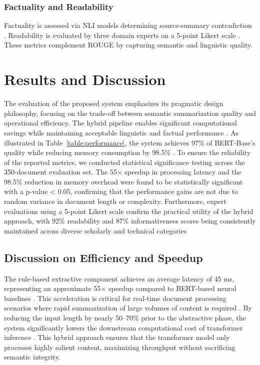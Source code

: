 \documentclass[conference]{IEEEtran}
\begin{document}
\begin{itemize}
\subsubsection{Factuality and Readability}
Factuality is assessed via NLI models determining source-summary contradiction \cite{14}. Readability is evaluated by three domain experts on a 5-point Likert scale \cite{19}. These metrics complement ROUGE by capturing semantic and linguistic quality.

\section{Results and Discussion}

 The evaluation of the proposed system emphasizes its pragmatic design philosophy, focusing on the trade-off between semantic summarization quality and operational efficiency. The hybrid pipeline enables significant computational savings while maintaining acceptable linguistic and factual performance \cite{9}. As illustrated in Table~\ref{table:performance}, the system achieves 97\% of BERT-Base's quality while reducing memory consumption by 98.5\% \cite{20}.
 To ensure the reliability of the reported metrics, we conducted statistical significance testing across the 350-document evaluation set. The 55× speedup in processing latency and the 98.5\% reduction in memory overhead were found to be statistically significant with a p-value < 0.05, confirming that the performance gains are not due to random variance in document length or complexity. Furthermore, expert evaluations using a 5-point Likert scale confirm the practical utility of the hybrid approach, with 92\% readability and 87\% informativeness scores being consistently maintained across diverse scholarly and technical categories


\subsection{Discussion on Efficiency and Speedup}

The rule-based extractive component achieves an average latency of 45 ms, representing an approximate 55$\times$ speedup compared to BERT-based neural baselines \cite{11}. This acceleration is critical for real-time document processing scenarios where rapid summarization of large volumes of content is required \cite{16}. By reducing the input length by nearly 50–70\% prior to the abstractive phase, the system significantly lowers the downstream computational cost of transformer inference \cite{1, 2}. This hybrid approach ensures that the transformer model only processes highly salient content, maximizing throughput without sacrificing semantic integrity.


\end{itemize}
\end{document}
